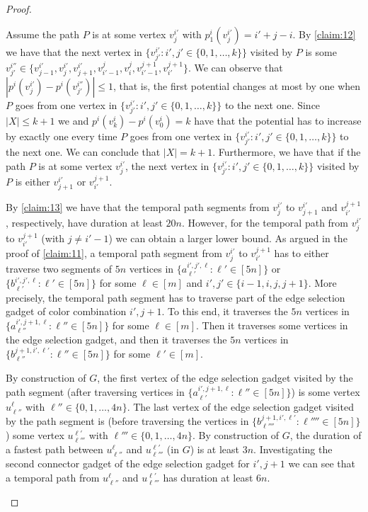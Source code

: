 \documentclass[a4paper,UKenglish,cleveref, autoref, thm-restate]{lipics-v2021}
\begin{document}
\begin{proof}
\begin{claimproof}
    Assume the path $P$ is at some vertex $v^{i'}_j$ with $p^i_1(v^{i'}_j)=i'+j-i$.
    By \cref{claim:12} we have that the next vertex in  $\{v^{i'}_{j'} :  i',j'\in \{0,1,\ldots,k\}\}$ visited by $P$ is some $v^{i''}_{j'}\in \{v^{i'}_{j-1},v^{i'}_j,v^{i'}_{j+1},v^j_{i'-1},v^j_i,v^{j+1}_{i'-1},v^{j+1}_{i'}\}$. We can observe that $|p^i(v^{i'}_j)-p^i(v^{i''}_{j'})|\le 1$, that is, the first potential changes at most by one when $P$ goes from one vertex in $\{v^{i'}_{j'} :  i',j'\in \{0,1,\ldots,k\}\}$ to the next one.
    Since $|X|\le k+1$ we and $p^i(v^i_k)-p^i(v^i_0)=k$ have that the  potential has to increase by exactly one every time $P$ goes from one vertex in $\{v^{i'}_{j'} :  i',j'\in \{0,1,\ldots,k\}\}$ to the next one. 
    We can conclude that $|X|=k+1$.
    Furthermore, we have that if the path $P$ is at some vertex $v^{i'}_j$, the next vertex in $\{v^{i'}_{j'} :  i',j'\in \{0,1,\ldots,k\}\}$ visited by $P$ is either $v^{i'}_{j+1}$ or $v^{j+1}_{i'}$.

    By \cref{claim:13} we have that the temporal path segments from $v^{i'}_j$ to $v^{i'}_{j+1}$ and $v^{j+1}_{i'}$, respectively, have duration at least $20n$. However, for the temporal path from $v^{i'}_j$ to $v^{j+1}_{i'}$ (with $j\neq i'-1$) we can obtain a larger lower bound.
As argued in the proof of \cref{claim:11}, a temporal path segment from $v^{i'}_j$ to $v^{j+1}_{i'}$ has to either traverse two segments of $5n$ vertices in $\{a^{i',j',\ell}_{\ell'} :  \ell'\in[5n]\}$ or $\{b^{i',j',\ell}_{\ell'} :  \ell'\in[5n]\}$ for some $\ell\in[m]$ and $i',j'\in\{i-1,i,j,j+1\}$. 
More precisely, the temporal path segment has to traverse part of the edge selection gadget of color combination $i',j+1$. To this end, it traverses the $5n$ vertices in $\{a^{i',j+1,\ell}_{\ell''} :  \ell''\in[5n]\}$ for some $\ell\in[m]$. Then it traverses some vertices in the edge selection gadget, and then it traverses the $5n$ vertices in $\{b^{j+1,i',\ell'}_{\ell''} :  \ell''\in[5n]\}$ for some $\ell'\in[m]$.

By construction of $G$, the first vertex of the edge selection gadget visited by the path segment (after traversing vertices in $\{a^{i',j+1,\ell}_{\ell'} :  \ell''\in[5n]\}$) is some vertex $u^\ell_{\ell''}$ with $\ell''\in\{0,1,\ldots,4n\}$.
The last vertex of the edge selection gadget visited by the path segment is (before traversing the vertices in $\{b^{j+1,i',\ell'}_{\ell''''} :  \ell''''\in[5n]\}$) some vertex $u^{\ell'}_{\ell'''}$ with $\ell'''\in\{0,1,\ldots,4n\}$. By construction of $G$, the duration of a fastest path between $u^\ell_{\ell''}$ and $u^{\ell'}_{\ell'''}$ (in $G$) is at least $3n$.
Investigating the second connector gadget of the edge selection gadget for $i',j+1$ we can see that a temporal path from $u^\ell_{\ell''}$ and $u^{\ell'}_{\ell'''}$ has duration at least $6n$.


\end{claimproof}
\end{proof}
\end{document}
